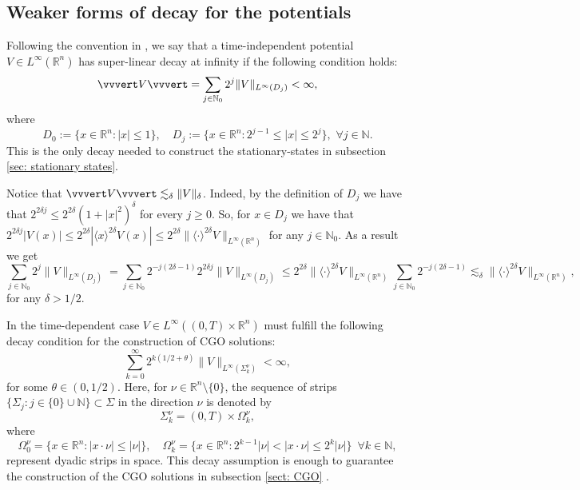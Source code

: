 \documentclass[10pt,a4paper]{amsart}
\theoremstyle{remark}
\theoremstyle{definition}
\newcommand{\R}{\mathbb{R}}
\newcommand{\N}{\mathbb{N}}
\def\lec{\lesssim}
\begin{document}
\subsection{Weaker forms of decay for the potentials}\label{subsec:potential_decay}
%
%

Following the convention in \cite{zbMATH08122191}, we say that a time-independent potential $V\in L^\infty(\R^n)$ has super-linear decay at infinity if the following condition holds:
%
\begin{equation}\label{eq: pol_decay_V}
\vvvert V \vvvert = \sum_{j\in\mathbb N_0} 2^j \|V\|_{L^\infty(D_j)} < \infty,
\end{equation}
%
where
%
\begin{equation}\label{eq: disks}
D_0 := \{ x\in \R^n : |x|\leq 1\}, \quad D_j := \{ x\in\R^n : 2^{j-1} \leq |x| \leq 2^j \}, \,\, \forall j\in\mathbb N .
\end{equation}
%
This is the only decay needed to construct the stationary-states in subsection \ref{sec: stationary states}.

Notice that  $\vvvert V \vvvert \lec_\delta \| V \|_\delta$. Indeed, by the definition of $D_j$ we have that 
$2^{2\delta j} \leq 2^{2\delta} (1+|x|^2)^\delta$ for every $j\geq 0$. So, for $x\in D_j$ we have that 
$2^{2\delta j}|V(x)| \leq 2^{2\delta}|\langle x\rangle^{2\delta} V(x)| \leq 2^{2\delta}\|\langle \cdot \rangle^{2\delta} V\|_{L^\infty(\R^n)}$ for any $j\in\mathbb N_0$. As a result we get 
%
\[
\sum_{j\in\N_0} 2^j \|V\|_{L^\infty(D_j)} = \sum_{j\in\N_0} 2^{-j(2\delta-1)} 2^{2\delta j} \|V\|_{L^\infty(D_j)} 
\leq 2^{2\delta}\|\langle \cdot \rangle^{2\delta} V\|_{L^\infty(\R^n)} \sum_{j\in\N_0} 2^{-j (2\delta-1)}
\lec_\delta \| \langle \cdot \rangle^{2\delta} V\|_{L^\infty(\R^n)},
\]
%
for any $\delta > 1/2$.




In the time-dependent case $V\in L^\infty((0, T)\times \R^n)$ must fulfill the following decay condition for the construction of CGO solutions:
%
\begin{equation}\label{eq: polynomial_decay_V_t}
\sum_{k=0}^\infty 2^{k(1/2+\theta)}\|V\|_{L^\infty(\Sigma^\nu_k)}<\infty,
\end{equation}
%
for some $\theta\in(0,1/2)$. Here, for $\nu\in\R^n\setminus \{0\}$, the sequence of strips $\{ \Sigma_j : j\in \{0\}\cup \N\} \subset \Sigma$ in the direction $\nu$ is denoted by
%
\begin{equation}\label{eq: strips}
\Sigma^\nu_k = (0,T) \times \Omega^\nu_k,
\end{equation}
%
where 
\begin{equation}\label{eq: d_strips_space}
\Omega^\nu_0 = \{ x \in \R^n : |x \cdot \nu| \leq |\nu|  \}, \quad
\Omega^\nu_k = \{ x \in \R^n : 2^{k - 1} |\nu|< |x \cdot \nu| \leq 2^k |\nu|\}  \enspace \forall k \in \N, 
\end{equation}
represent dyadic strips in space. This decay assumption is enough to guarantee the construction of the CGO solutions in subsection \ref{sect: CGO} \cite{zbMATH07801151}.
\end{document}
